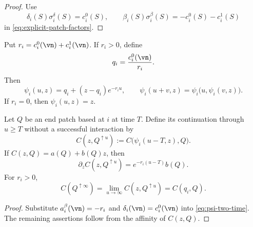 \begin{proof}
Use
\[
  \delta_i(S)\sigma_i^\delta(S)=c_i^0(S),
  \qquad
  \beta_i(S)\sigma_i^\beta(S)
  =-c_i^0(S)-c_i^1(S)
\]
in \eqref{eq:explicit-patch-factors}.
\end{proof}

\begin{proposition}
\label{prop:continuation-relaxation}
Put \(r_i=c_i^0(\vn)+c_i^1(\vn)\). If \(r_i>0\), define
\[
  q_i=\frac{c_i^0(\vn)}{r_i}.
\]
Then
\begin{equation}
  \psi_i(u,z)
  =
  q_i+(z-q_i)e^{-r_iu},
  \qquad
  \psi_i(u+v,z)
  =
  \psi_i\bigl(u,\psi_i(v,z)\bigr).
  \label{eq:empty-neighbour-relaxation}
\end{equation}
If \(r_i=0\), then \(\psi_i(u,z)=z\).

Let \(Q\) be an end patch based at \(i\) at time \(T\). Define its
continuation through \(u\ge T\) without a successful interaction by
\begin{equation}
  C(z,Q^{\uparrow u})
  :=
  C\bigl(\psi_i(u-T,z),Q\bigr).
  \label{eq:continuation-contribution}
\end{equation}
If \(C(z,Q)=a(Q)+b(Q)z\), then
\begin{equation}
  \partial_zC(z,Q^{\uparrow u})
  =
  e^{-r_i(u-T)}b(Q).
  \label{eq:continuation-slope}
\end{equation}
For \(r_i>0\),
\[
  C(Q^{\uparrow\infty})
  =
  \lim_{u\to\infty}C(z,Q^{\uparrow u})
  =
  C(q_i,Q).
\]
\end{proposition}

\begin{proof}
Substitute \(a_i^\beta(\vn)=-r_i\) and
\(\delta_i(\vn)=c_i^0(\vn)\) into
\eqref{eq:psi-two-time}. The remaining assertions follow from the
affinity of \(C(z,Q)\).
\end{proof}
